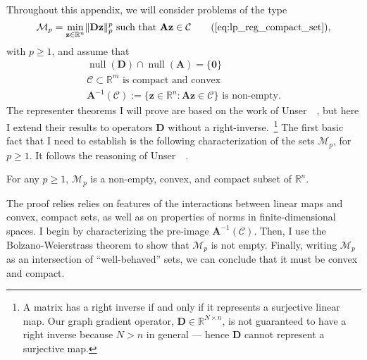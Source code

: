 Throughout this appendix, we will consider problems of the type
\begin{equation}
    \mathcal{M}_p = \underset{\mathbf{z} \in \mathbb{R}^{n}}{\min} \| \mathbf{D z} \|_p^p \text{ such that } \mathbf{Az} \in \mathcal{C} \tag{\ref{eq:lp_reg_compact_set}},
\end{equation}
with $p \geq 1$, and assume that
\begin{align}
    \tag{A1} \label{ass:representer_null} \operatorname{null} \left ( \mathbf{D} \right ) \cap \operatorname{null} \left ( \mathbf{A} \right ) = \{ \mathbf{0} \}\\
    \tag{A2} \label{ass:representer_compact_convex} \mathcal{C} \subset \mathbb{R}^{m} \text{ is compact and convex} \\
    \tag{A3} \label{ass:representer_feasible} \mathbf{A}^{-1}(\mathcal{C}) := \{\mathbf{z} \in \mathbb{R}^{n}: \mathbf{Az} \in \mathcal{C}\} \text{ is non-empty}.
\end{align}
The representer theorems I will prove are based on the work of Unser~\etal~\cite{unser2016}, but here I extend their results to operators $\mathbf{D}$ without a right-inverse.~\footnote{A matrix has a right inverse if and only if it represents a surjective linear map. Our graph gradient operator, $\mathbf{D} \in \mathbb{R}^{N \times n}$, is not guaranteed to have a right inverse because $N > n$ in general --- hence $\mathbf{D}$ cannot represent a surjective map.} The first basic fact that I need to establish is the following characterization of the sets $\mathcal{M}_p$, for $p \geq 1$. It follows the reasoning of Unser~\etal~\cite[Lemma 20]{unser2016}.

\begin{lemma}\label{lem:nonempty-convex-compact}
    For any $p \geq 1$, $\mathcal{M}_p$ is a non-empty, convex, and compact subset of $\mathbb{R}^{n}$.
\end{lemma}

The proof relies relies on features of the interactions between linear maps and convex, compact sets, as well as on properties of norms in finite-dimensional spaces. I begin by characterizing the pre-image $\mathbf{A}^{-1}(\mathcal{C})$. Then, I use the Bolzano-Weierstrass theorem to show that $\mathcal{M}_p$ is not empty. Finally, writing $\mathcal{M}_p$ as an intersection of ``well-behaved'' sets, we can conclude that it must be convex and compact.

